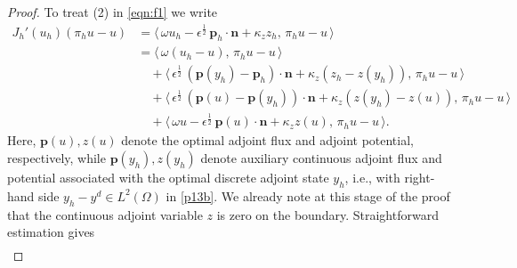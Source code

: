 \documentclass[10pt,a4paper]{amsart}
\newcommand{\bn}{{\mathbf{n}}}
\newcommand{\bp}{{\mathbf{p}}}
\newcommand{\hF}{{\frac{1}{2}}}
\begin{document}
\begin{proof}
To treat (2) in \eqref{eqn:f1} we write
\begin{align}\label{eqn:f5}
J_h'(u_h)(\pi_h u - u)
  &= \langle\, \omega u_h - \epsilon^{\hF} \, \bp_h \cdot \bn + \kappa_z z_h ,\, \pi_h u - u \,\rangle \nonumber \\[0.3em]
  &= \langle\, \omega (u_h-u),\, \pi_h u - u \,\rangle \nonumber\\
  &\quad
     + \langle\, \epsilon^{\hF} \, (\bp(y_h) -\bp_h)\cdot \bn 
       + \kappa_z (z_h - z(y_h)),\, \pi_h u - u \,\rangle  \nonumber\\
  &\quad
     + \langle\, \epsilon^{\hF} \, (\bp(u)-\bp(y_h))\cdot \bn
       + \kappa_z (z(y_h) - z(u)),\, \pi_h u - u \,\rangle  \nonumber\\
  &\quad
     + \langle\, \omega u -  \epsilon^{\hF} \,\bp(u)\cdot \bn + \kappa_z z(u),\, \pi_h u - u \,\rangle.
\end{align}
Here, $\bp(u),z(u)$ denote the optimal adjoint flux and adjoint potential, respectively, while $\bp(y_h),z(y_h)$ denote auxiliary continuous adjoint flux and potential associated with the optimal discrete adjoint state $y_h$, i.e., with right-hand side $y_h - y^d \in L^2(\Omega)$ in \eqref{p13b}. We already  note at this stage of the proof that the continuous adjoint variable $z$ is zero on the boundary. Straightforward estimation gives
\begin{multline}\label{extra-term}

\end{multline}
\end{proof}
\end{document}
